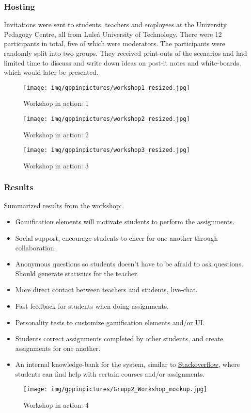 \subsubsection{Hosting}
Invitations were sent to students, teachers and employees at the University Pedagogy Centre, all from Luleå University of Technology. There were 12 participants in total, five of which were moderators. The participants were randomly split into two groups. They received print-outs of the scenarios and had limited time to discuss and write down ideas on post-it notes and white-boards, which would later be presented.

\begin{figure}[H]
\centering
\texttt{[image: img/gppinpictures/workshop1\_resized.jpg]}
\caption{Workshop in action: 1}
\label{fig:workshop1}
\end{figure}

\begin{figure}[H]
\centering
\texttt{[image: img/gppinpictures/workshop2\_resized.jpg]}
\caption{Workshop in action: 2}
\label{fig:workshop2}
\end{figure}

\begin{figure}[H]
\centering
\texttt{[image: img/gppinpictures/workshop3\_resized.jpg]}
\caption{Workshop in action: 3}
\label{fig:workshop3}
\end{figure}

\subsubsection{Results}
Summarized results from the workshop:

\begin{itemize}
    \item Gamification elements will motivate students to perform the assignments.
    \item Social support, encourage students to cheer for one-another through collaboration.
    \item Anonymous questions so students doesn't have to be afraid to ask questions. Should generate statistics for the teacher.
    \item More direct contact between teachers and students, live-chat.
    \item Fast feedback for students when doing assignments. 
    \item Personality tests to customize gamification elements and/or UI.
    \item Students correct assignments completed by other students, and create assignments for one another.
    \item An internal knowledge-bank for the system, similar to \href{https://stackoverflow.com/}{Stackoverflow}, where students can find help with certain courses and/or assignments.
\end{itemize}

\begin{figure}[H]
\centering
\texttt{[image: img/gppinpictures/Grupp2\_Workshop\_mockup.jpg]}
\caption{Workshop in action: 4}
\label{fig:workshop4}
\end{figure}
